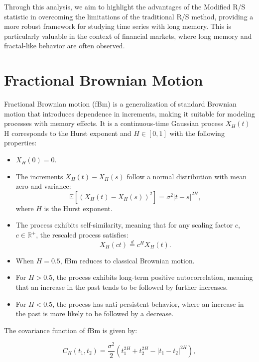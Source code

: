 \documentclass[11pt]{extarticle}
\begin{document}
Through this analysis, we aim to highlight the advantages of the Modified R/S statistic in overcoming the limitations of the traditional R/S method, providing a more robust framework for studying time series with long memory. This is particularly valuable in the context of financial markets, where long memory and fractal-like behavior are often observed.



\section{Fractional Brownian Motion}

Fractional Brownian motion (fBm) is a generalization of standard Brownian motion that introduces dependence in increments,
making it suitable for modeling processes with memory effects. It is a continuous-time Gaussian process \( X_H(t) \) H corresponds
to the Hurst exponent and \( H \in [0, 1] \) with the following properties:

\begin{itemize}
    \item \( X_H(0) = 0 \).
    \item The increments \( X_H(t) - X_H(s) \) follow a normal distribution with mean zero and variance:
    \begin{equation}
        \mathbb{E} \left[ (X_H(t) - X_H(s))^2 \right] = \sigma^2|t - s|^{2H},
    \end{equation}
    where \( H \) is the Hurst exponent.
    \item The process exhibits self-similarity, meaning that for any scaling factor \( c \), \( c \in \mathbb{R}^+ \), the rescaled process satisfies:
    \begin{equation}
        X_H(ct) \overset{d}{=} c^H X_H(t).
    \end{equation}
    \item When \( H = 0.5 \), fBm reduces to classical Brownian motion.
    \item For \( H > 0.5 \), the process exhibits long-term positive autocorrelation, meaning that an increase in the past tends to be followed by further increases.
    \item For \( H < 0.5 \), the process has anti-persistent behavior, where an increase in the past is more likely to be followed by a decrease.
\end{itemize}

The covariance function of fBm is given by:

\begin{equation}
    C_H(t_1, t_2) = \frac{\sigma^2}{2} \left( t_1^{2H} + t_2^{2H} - |t_1 - t_2|^{2H} \right),
    \label{eq:fbm_covariance}
\end{equation}
\end{document}
